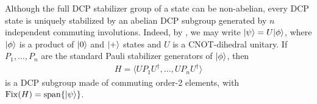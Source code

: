 \begin{remark}
Although the full DCP stabilizer group of a state can be non-abelian, every DCP state is uniquely stabilized by an abelian DCP subgroup generated by $n$ independent commuting involutions.
Indeed, by , we may write $|\psi\rangle=U|\phi\rangle$, where $|\phi\rangle$ is a product of $|0\rangle$ and $|+\rangle$ states and $U$ is a CNOT-dihedral unitary.
If $P_1,\ldots,P_n$ are the standard Pauli stabilizer generators of $|\phi\rangle$, then
\begin{align}
    H=\langle UP_1U^\dagger,\ldots,UP_nU^\dagger\rangle
\end{align}
is a DCP subgroup made of commuting order-2 elements, with $\operatorname{Fix}(H)=\operatorname{span}\{|\psi\rangle\}$.
\end{remark}
